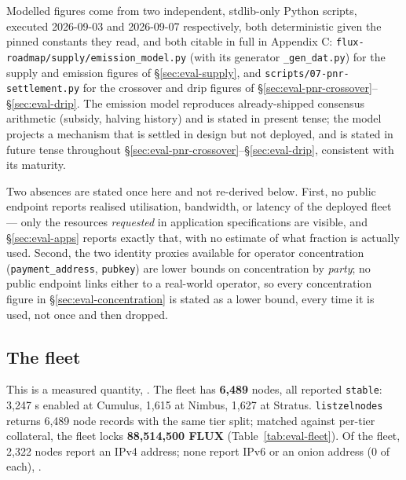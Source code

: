 Modelled figures come from two independent, stdlib-only Python scripts, executed
2026-09-03 and 2026-09-07 respectively, both deterministic given the pinned constants they read, and both citable in full in
Appendix C: \texttt{flux-\allowbreak{}roadmap/\allowbreak{}supply/\allowbreak{}emission\_model.\allowbreak{}py} (with its generator
\texttt{\_gen\_dat.py}) for the supply and emission figures of \S\ref{sec:eval-supply}, and
\texttt{scripts/\allowbreak{}07-pnr-settlement.\allowbreak{}py} for the \PNR crossover and drip figures of
\S\ref{sec:eval-pnr-crossover}--\S\ref{sec:eval-drip}. The emission model reproduces already-shipped
consensus arithmetic (\PoN subsidy, halving history) and is stated in present tense; the \PNR
model projects a mechanism that is settled in design but not deployed, and is stated in future
tense throughout \S\ref{sec:eval-pnr-crossover}--\S\ref{sec:eval-drip}, consistent with its
\planned maturity.

Two absences are stated once here and not re-derived below. First, no public endpoint reports
realised utilisation, bandwidth, or latency of the deployed fleet — only the resources
\emph{requested} in application specifications are visible, and \S\ref{sec:eval-apps} reports
exactly that, with no estimate of what fraction is actually used. Second, the two identity proxies
available for operator concentration (\texttt{payment\_address}, \texttt{pubkey}) are lower bounds
on concentration by \emph{party}; no public endpoint links either to a real-world operator, so
every concentration figure in \S\ref{sec:eval-concentration} is stated as a lower bound, every time
it is used, not once and then dropped.

\subsection{The fleet}
\label{sec:eval-fleet}

This is a measured quantity, \shipped {}.
The fleet has \textbf{6,489} nodes, all reported \texttt{stable}: 3,247 \FluxNode{}s enabled at
Cumulus, 1,615 at Nimbus, 1,627 at Stratus. \texttt{listzelnodes} returns 6,489 node records with
the same tier split; matched against per-tier collateral, the fleet locks \textbf{88,514,500 FLUX}
(Table~\ref{tab:eval-fleet}). Of the fleet, 2,322 nodes report an IPv4 address; none report IPv6 or
an onion address (0 of each), \shipped {}.

